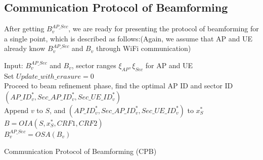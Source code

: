 \documentclass[conference]{IEEEtran}
\begin{document}
\subsection{Communication Protocol of Beamforming}
After getting $B^{AP\_Sec}_{v}$, we are ready for presenting the protocol of beamforming for a single point, which is described as follows:(Again, we assume that AP and UE already know $B^{AP\_Sec}_{v}$ and $B_{v}$ through WiFi communication) 
\begin{algorithm}[H]	
    Input: $B^{AP\_Sec}_{v}$ and $B_{v}$, sector ranges $\xi_{AP},\xi_{Sec}$ for AP and UE\\
    Set $Update\_with\_erasure = 0$\\
    Proceed to beam refinement phase, find the optimal AP ID and sector ID $(AP\_ID^{*}_{v}, Sec\_AP\_ID^{*}_{v}, Sec\_UE\_ID^{*}_{v})$\\
    Append $v$ to $S$, and $(AP\_ID^{*}_{v}, Sec\_AP\_ID^{*}_{v}, Sec\_UE\_ID^{*}_{v})$ to $x_{S}^{*}$\\
    $B=OIA(S,x_{S}^{*},CRF1,CRF2)$\\
     {$B^{AP\_Sec}_{v}= OSA(B_{v})$}
	\caption{Communication Protocol of Beamforming (CPB)}
\end{algorithm}
\end{document}
